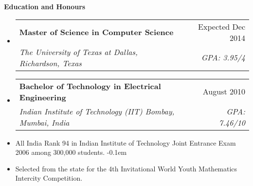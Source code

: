 \documentclass[letterpaper,11pt]{article}
\makeatletter
\newcommand{\resheading}[1]{{\large \colorbox{mygrey}{\begin{minipage}{\textwidth}{\textbf{#1 \vphantom{p\^{E}}}}\end{minipage}}}}
\newcommand{\ressubheading}[4]{
\begin{tabular*}{7.0in}{l@{\extracolsep{\fill}}r}
		\textbf{#1} & #2 \\
		\textit{#3} & \textit{#4} \\
\end{tabular*}\vspace{-6pt}}
\makeatother
\begin{document}
\resheading{Education and Honours}
\begin{itemize}

\item
	\ressubheading{Master of Science in Computer Science}{Expected Dec 2014}{The University of Texas at Dallas, Richardson, Texas}{GPA: 3.95/4}
	
\item
	\ressubheading{Bachelor of Technology in Electrical Engineering}{August 2010}{Indian Institute of Technology (IIT) Bombay, Mumbai, India}{GPA: 7.46/10}

\item{All India Rank 94 in Indian Institute of Technology Joint Entrance Exam 2006 among 300,000 students.}
\itemsep-0.1em
\item{Selected from the state for the 4th Invitational World Youth Mathematics Intercity Competition.}

\end{itemize}
\end{document}
